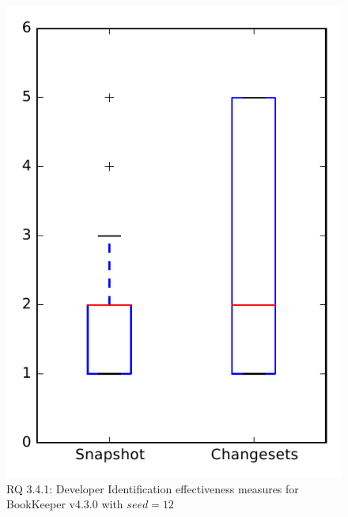 
\begin{figure}
\centering
\includegraphics[height=0.4\textheight]{figures/dit_seed/rq1_bookkeeper_12}
\caption{RQ 3.4.1: Developer Identification effectiveness measures for BookKeeper v4.3.0 with $seed=12$}
\label{fig:dit_seed:rq1:bookkeeper}
\end{figure}
